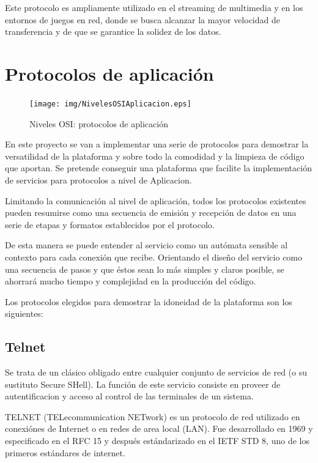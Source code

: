 \documentclass[a4paper,spanish,12pt]{book}
\begin{document}
Este protocolo es ampliamente utilizado en el streaming de multimedia y en los entornos de juegos en red, donde se busca alcanzar la mayor velocidad de transferencia y de que se garantice la solidez de los datos.

\section{Protocolos de aplicación}

\begin{figure}
	\texttt{[image: img/NivelesOSIAplicacion.eps]}	
              \caption{Niveles OSI: protocolos de aplicación}
  \label{fig:nivelesOSIAplicacion}
\end{figure}

En este proyecto se van a implementar una serie de protocolos para demostrar la versatilidad de la plataforma y sobre todo la comodidad y la limpieza de código que aportan. Se pretende conseguir una plataforma que facilite la implementación de servicios para protocolos a nivel de Aplicacion.

Limitando la comunicación al nivel de aplicación, todos los protocolos existentes pueden resumirse como una secuencia de emisión y recepción de datos en una serie de etapas y formatos establecidos por el protocolo. 

De esta manera se puede entender al servicio como un autómata sensible al contexto para cada conexión que recibe. Orientando el diseño del servicio como una secuencia de pasos y que éstos sean lo más simples y claros posible, se ahorrará mucho tiempo y complejidad en la producción del código. 

Los protocolos elegidos para demostrar la idoneidad de la plataforma son los siguientes:

\subsection{Telnet}
Se trata de un cl\'asico obligado entre cualquier conjunto de servicios de red (o su sustituto Secure SHell). La función de este servicio consiste en proveer de autentificacion y acceso al control de las terminales de un sistema.

TELNET (TELecommunication NETwork) es un protocolo de red utilizado en conexiónes de Internet o en redes de area local (LAN). Fue desarrollado en 1969 y especificado en el RFC 15 y después estándarizado en el IETF STD 8, uno de los primeros estándares de internet.
\end{document}
